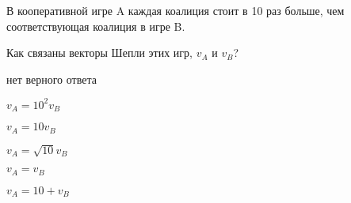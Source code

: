 
\begin{question}
В кооперативной игре A каждая коалиция стоит в 10 раз больше,
чем соответствующая коалиция в игре B.

Как связаны векторы Шепли этих игр, \(v_A\) и \(v_B\)?
\begin{answerlist}
  \item нет верного ответа
  \item \(v_A = 10^2 v_B\)
  \item \(v_A = 10 v_B\)
  \item \(v_A = \sqrt{10} v_B\)
  \item \(v_A = v_B\)
  \item \(v_A = 10 + v_B\)
\end{answerlist}
\end{question}


